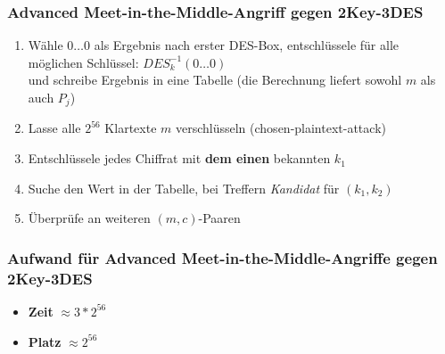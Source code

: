 \documentclass[12pt,A4]{extarticle}
\begin{document}
\subsubsection{Advanced Meet-in-the-Middle-Angriff gegen 2Key-3DES}
\begin{enumerate}
  \item{Wähle $0 \dots 0$ als Ergebnis nach erster DES-Box, entschlüssele für alle möglichen Schlüssel: $DES^{-1}_k(0 \dots 0)$\\
  und schreibe Ergebnis in eine Tabelle (die Berechnung liefert sowohl $m$ als auch $P_j$)}
  \item{Lasse alle $2^{56}$ Klartexte $m$ verschlüsseln (chosen-plaintext-attack)}
  \item{Entschlüssele jedes Chiffrat mit \textbf{dem einen} bekannten $k_1$}
  \item{Suche den Wert in der Tabelle, bei Treffern \textit{Kandidat} für $(k_1, k_2)$}
  \item{Überprüfe an weiteren $(m, c)$-Paaren}
\end{enumerate}

\subsubsection{Aufwand für Advanced Meet-in-the-Middle-Angriffe gegen 2Key-3DES}
\begin{itemize}
  \item{\textbf{Zeit} $\approx 3 * 2^{56}$}
  \item{\textbf{Platz} $\approx 2^{56}$}
\end{itemize}
\end{document}
